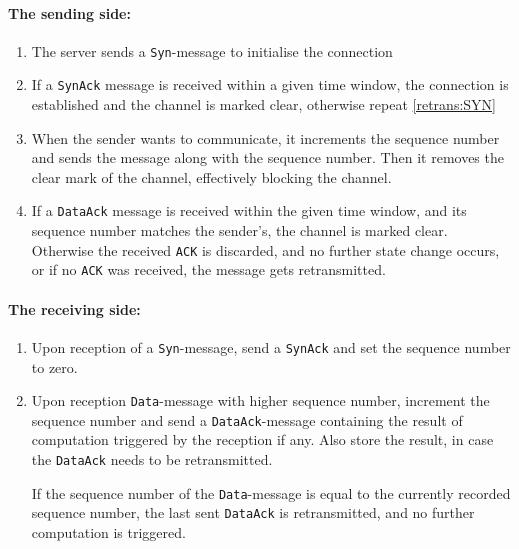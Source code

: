 \paragraph{The sending side:}
\begin{enumerate}

\item \label{retrans:SYN}
The server sends a \texttt{Syn}-message to initialise the connection

\item If a \texttt{SynAck} message is received within a given time window, the
connection is established and the channel is marked clear, otherwise repeat \ref{retrans:SYN}

\item \label{retrans:Send} When the sender wants to communicate, it increments
the sequence number and sends the message along with the sequence number. Then it
removes the clear mark of the channel, effectively blocking the channel.

\item If a \texttt{DataAck} message is received within the given time window,
and its sequence number matches the sender's, the channel is marked clear.
Otherwise the received \texttt{ACK} is discarded, and no further state change
occurs, or if no \texttt{ACK} was received, the message gets retransmitted.

\end{enumerate} \paragraph{The receiving side:} \begin{enumerate}

\item Upon reception of a \texttt{Syn}-message, send a \texttt{SynAck} and set
the sequence number to zero.

\item Upon reception \texttt{Data}-message with higher sequence number,
increment the sequence number and send a \texttt{DataAck}-message containing the
result of computation triggered by the reception if any. Also store the result,
in case the \texttt{DataAck} needs to be retransmitted.

If the sequence number of the \texttt{Data}-message is equal to the currently
recorded sequence number, the last sent \texttt{DataAck} is retransmitted, and
no further computation is triggered.

\end{enumerate}

